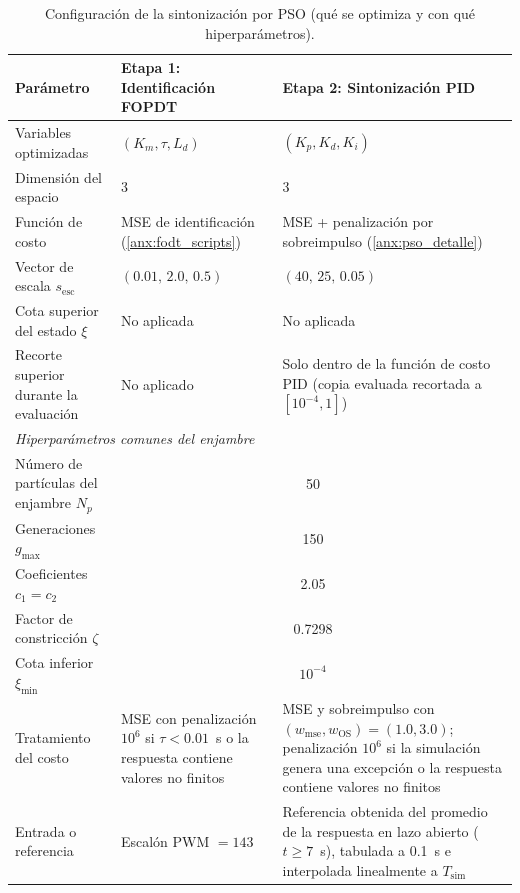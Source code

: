 \begin{appendices}
\begin{table}[H]
\centering
\caption{Configuración de la sintonización por PSO (qué se optimiza y con qué hiperparámetros).}
\label{tab:pso_config}
\small
\begin{tabular}{p{5.2cm} p{4.3cm} p{4.3cm}}
\toprule
\textbf{Parámetro} & \textbf{Etapa 1: Identificación FOPDT} & \textbf{Etapa 2: Sintonización PID} \\
\midrule
Variables optimizadas & $(K_m,\tau,L_d)$ & $(K_p,K_d,K_i)$ \\
Dimensión del espacio & 3 & 3 \\
Función de costo & MSE de identificación (\ref{anx:fodt_scripts}) & MSE + penalización por sobreimpulso (\ref{anx:pso_detalle}) \\
Vector de escala $s_{\mathrm{esc}}$ & $(0.01,\,2.0,\,0.5)$ & $(40,\,25,\,0.05)$ \\
Cota superior del estado $\xi$ & No aplicada & No aplicada \\
Recorte superior durante la evaluación & No aplicado & Solo dentro de la función de costo PID (copia evaluada recortada a $[10^{-4},1]$) \\
\midrule
\multicolumn{3}{l}{\textit{Hiperparámetros comunes del enjambre}} \\
Número de partículas del enjambre $N_p$ & \multicolumn{2}{c}{50} \\
Generaciones $g_{\max}$ & \multicolumn{2}{c}{150} \\
Coeficientes $c_1=c_2$ & \multicolumn{2}{c}{2.05} \\
Factor de constricción $\zeta$ & \multicolumn{2}{c}{0.7298} \\
Cota inferior $\xi_{\min}$ & \multicolumn{2}{c}{$10^{-4}$} \\
Tratamiento del costo & MSE con penalización $10^{6}$ si $\tau<0.01$~s o la respuesta contiene valores no finitos & MSE y sobreimpulso con $(w_{\mathrm{mse}},w_{\mathrm{OS}})=(1.0,3.0)$; penalización $10^{6}$ si la simulación genera una excepción o la respuesta contiene valores no finitos \\
Entrada o referencia & Escalón PWM $=143$ & Referencia obtenida del promedio de la respuesta en lazo abierto ($t\geq7$~s), tabulada a 0.1~s e interpolada linealmente a $T_{\mathrm{sim}}$ \\
\bottomrule
\end{tabular}
\end{table}


\end{appendices}
